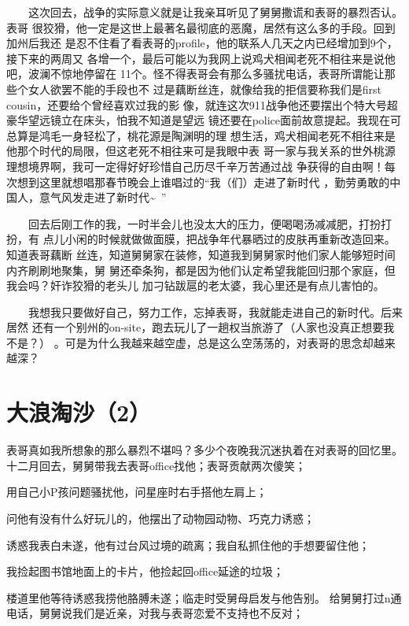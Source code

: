 \documentclass[12pt]{book}
\begin{document}
　　这次回去，战争的实际意义就是让我亲耳听见了舅舅撒谎和表哥的暴烈否认。表哥
很狡猾，他一定是这世上最著名最彻底的恶魔，居然有这么多的手段。回到加州后我还
是忍不住看了看表哥的profile，他的联系人几天之内已经增加到9个，接下来的两周又
各增一个，最后可能以为我网上说鸡犬相闻老死不相往来是说他吧，波澜不惊地停留在
11个。怪不得表哥会有那么多骚扰电话，表哥所谓能让那些个女人欲罢不能的手段也不
过是藕断丝连，就像给我的拒信要称我们是first cousin，还要给个曾经喜欢过我的影
像，就连这次911战争他还要摆出个特大号超豪华望远镜立在床头，怕我不知道是望远
镜还要在police面前故意提起。我现在可总算是鸿毛一身轻松了，桃花源是陶渊明的理
想生活，鸡犬相闻老死不相往来是他那个时代的局限，但这老死不相往来可是我眼中表
哥一家与我关系的世外桃源理想境界啊，我可一定得好好珍惜自己历尽千辛万苦通过战
争获得的自由啊！每次想到这里就想唱那春节晚会上谁唱过的“我（们）走进了新时代
，勤劳勇敢的中国人，意气风发走进了新时代\textasciitilde{}~”

　　回去后刚工作的我，一时半会儿也没太大的压力，便喝喝汤减减肥，打扮打扮，有
点儿小闲的时候就做做面膜，把战争年代暴晒过的皮肤再重新改造回来。知道表哥藕断
丝连，知道舅舅家在装修，知道我到舅舅家时他们家人能够短时间内齐刷刷地聚集，舅
舅还牵条狗，都是因为他们认定希望我能回归那个家庭，但我会吗？奸诈狡猾的老头儿
加刁钻跋扈的老太婆，我心里还是有点儿害怕的。

　　我想我只要做好自己，努力工作，忘掉表哥，我就能走进自己的新时代。后来居然
还有一个别州的on-site，跑去玩儿了一趟权当旅游了（人家也没真正想要我不是？）
。可是为什么我越来越空虚，总是这么空荡荡的，对表哥的思念却越来越深？
\section{大浪淘沙（2）}
\label{sec-8-33}

表哥真如我所想象的那么暴烈不堪吗？多少个夜晚我沉迷执着在对表哥的回忆里。
\linebreak
\linebreak
十二月回去，舅舅带我去表哥office找他；表哥贡献两次傻笑；

用自己小P孩问题骚扰他，问星座时右手搭他左肩上；

问他有没有什么好玩儿的，他摆出了动物园动物、巧克力诱惑；

诱惑我表白未遂，他有过台风过境的疏离；我自私抓住他的手想要留住他；

我捡起图书馆地面上的卡片，他捡起回office延途的垃圾；

楼道里他等待诱惑我捞他胳膊未遂；临走时受舅母启发与他告别。
\linebreak
\linebreak
给舅舅打过n通电话，舅舅说我们是近亲，对我与表哥恋爱不支持也不反对；
\end{document}
